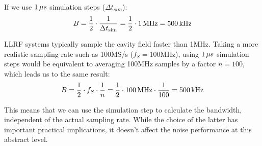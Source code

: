\documentclass[a4paper,12pt]{article}
\begin{document}
\noindent If we use $1\thinspace\mu s$ simulation steps ($\Delta t_{sim}$):
\begin{equation}
  \centering B = \frac{1}{2} \cdot \frac{1}{\Delta t_{\rm sim}}=\frac{1}{2} \cdot 1\thinspace {\rm MHz} = 500\thinspace {\rm kHz}
\end{equation}

LLRF systems typically sample the cavity field faster than 1\thinspace MHz. Taking a more realistic sampling rate such as 100\thinspace MS/s ($f_S=100$\thinspace MHz), using $1\thinspace\mu s$ simulation steps would be equivalent to averaging 100\thinspace MHz samples by a factor $n=100$, which leads us to the same result:
\begin{equation}
  \centering B = \frac{1}{2} \cdot f_S \cdot \frac{1}{n} = \frac{1}{2} \cdot 100\thinspace{\rm MHz} \cdot \frac{1}{100} = 500\thinspace{\rm kHz}
\end{equation}

\noindent This means that we can use the simulation step to calculate the bandwidth, independent of the actual sampling rate.  While the choice of the latter has important practical implications, it doesn't affect the noise performance at this abstract level.
\end{document}
